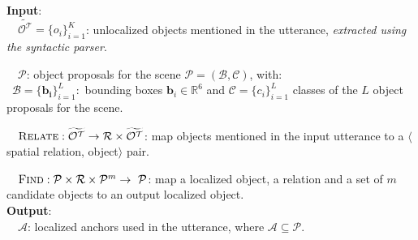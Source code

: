 \vspace{-2mm}
\begin{algorithm}[h]
    \scriptsize{
        \caption{\small Localizing objects mentioned in an input utterance}
        \label{alg_geomodule}
        \textbf{Input}: \vspace{0.25em}\\
        \null \ \textbullet \ $\widetilde{\mathcal{O^T}} = \{o_i\}_{i=1}^{K}$: unlocalized objects mentioned in the utterance, \textit{extracted using the syntactic parser}.
        \vspace{-1.em}
    
        \null \ \textbullet \ $\mathcal{P}$: object proposals for the scene $\mathcal{P} = (\mathcal{B}, \mathcal{C})$, with:\\
        \null \quad \quad \ $\mathcal{B} = \{\mathbf{b_i}\}_{i=1}^{L}$:\ bounding boxes $\mathbf{b}_i \in \mathbb{R}^6$ and $\mathcal{C} = \{ c_i\}_{i=1}^{L}$ classes of the $L$ object proposals for the scene.\\
        \vspace{-1.75em}
        
        \null \ \textbullet \ $\textsc{Relate}:\widetilde{\mathcal{O^T}} \rightarrow \mathcal{R} \times \widetilde{\mathcal{O^T}}$:
        map objects mentioned in the input utterance to a $\langle$spatial relation, object$\rangle$ pair.
        \vspace{-1em}
    
        \null \ \textbullet \ $\textsc{Find}:\mathcal{P} \times \mathcal{R} \times \mathcal{P}^{m} \rightarrow \ \mathcal{P}$: map a localized object, a relation and a set of $m$ candidate objects to an output localized object.\\
    
        \vspace{-0.5em}
        \textbf{Output}: \vspace{0.25em}\\
        \null \ \textbullet \ $\mathcal{A}$: localized anchors used in the utterance, where $\mathcal{A} \subseteq \mathcal{P}$.
        \vspace{0.5em}%
        
}
\end{algorithm}
